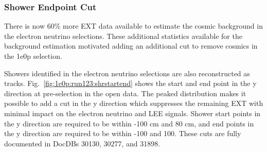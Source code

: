 \subsubsection{Shower Endpoint Cut}
\label{sec:sideband:newcuts:shrendpoint}
There is now 60\% more EXT data available to estimate the cosmic background in the electron neutrino selections.  These additional statistics available for the background estimation motivated adding an additional cut to remove cosmics in the 1e0p selection.  

Showers identified in the electron neutrino selections are also reconstructed as tracks.  Fig.~\ref{fig:1e0p:run123:shrstartend} shows the start and end point in the y direction at pre-selection in the open data. The peaked distribution makes it possible to add a cut in the y direction which suppresses the remaining EXT with minimal impact on the electron neutrino and LEE signals. Shower start points in the y direction are required to be within -100 cm and 80 cm, and end points in the y direction are required to be within -100 and 100. These cuts are fully documented in DocDBs 30130, 30277, and 31898.

